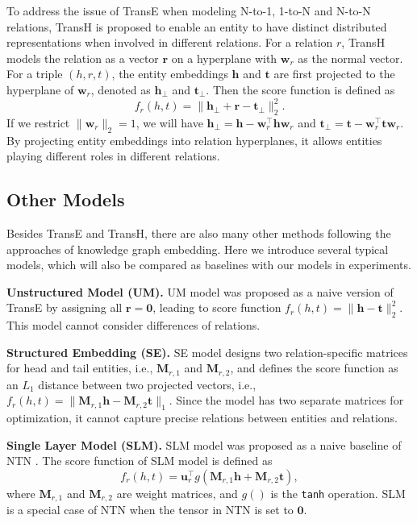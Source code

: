     To address the issue of TransE when modeling N-to-1, 1-to-N and N-to-N relations, TransH  is proposed to enable an entity to have distinct distributed representations when involved in different relations. For a relation $r$, TransH models the relation as a vector $\mathbf{r}$ on a hyperplane with $\mathbf{w}_r$ as the normal vector. For a triple $(h, r, t)$, the entity embeddings $\mathbf{h}$ and $\mathbf{t}$ are first projected to the hyperplane of $\mathbf{w}_r$, denoted as $\mathbf{h}_{\bot}$ and $\mathbf{t}_{\bot}$. Then the score function is defined as
    \begin{equation}
    f_{r}(h, t) = \|\mathbf{h}_{\bot} + \mathbf{r} - \mathbf{t}_{\bot}\|_{2}^{2}.
    \end{equation}
    If we restrict $\|\mathbf{w}_r\|_{2} = 1$, we will have $\mathbf{h}_{\bot} = \mathbf{h} - \mathbf{w}_{r}^{\top}\mathbf{h}\mathbf{w}_{r}$ and $\mathbf{t}_{\bot} = \mathbf{t} - \mathbf{w}_{r}^{\top}\mathbf{t}\mathbf{w}_{r}$. By projecting entity embeddings into relation hyperplanes, it allows entities playing different roles in different relations.

    \subsection{Other Models}
    Besides TransE and TransH, there are also many other methods following the approaches of knowledge graph embedding. Here we introduce several typical models, which will also be compared as baselines with our models in experiments.

    \textbf{Unstructured Model (UM).} UM model  was proposed as a naive version of TransE by assigning all $\mathbf{r} = \mathbf{0}$, leading to score function $f_r(h, t) =  \|\mathbf{h} - \mathbf{t}\|_{2}^{2}$. This model cannot consider differences of relations.

    \textbf{Structured Embedding (SE).} SE model  designs two relation-specific matrices for head and tail entities, i.e., $\mathbf{M}_{r, 1}$ and $\mathbf{M}_{r, 2}$, and defines the score function as an $L_1$ distance between two projected vectors, i.e., $f_r(h, t) =  \| \mathbf{M}_{r, 1} \mathbf{h} - \mathbf{M}_{r, 2} \mathbf{t} \|_1$. Since the model has two separate matrices for optimization, it cannot capture precise relations between entities and relations.

    \textbf{Single Layer Model (SLM).} SLM model was proposed as a naive baseline of NTN . The score function of SLM model is defined as
    \begin{equation}
    f_{r}(h, t) = \mathbf{u}_r^\top g (\mathbf{M}_{r, 1} \mathbf{h} + \mathbf{M}_{r, 2} \mathbf{t}),
    \end{equation}
    where $\mathbf{M}_{r, 1}$ and $\mathbf{M}_{r, 2}$ are weight matrices, and $g()$ is the \texttt{tanh} operation. SLM is a special case of NTN when the tensor in NTN is set to $\mathbf{0}$.

